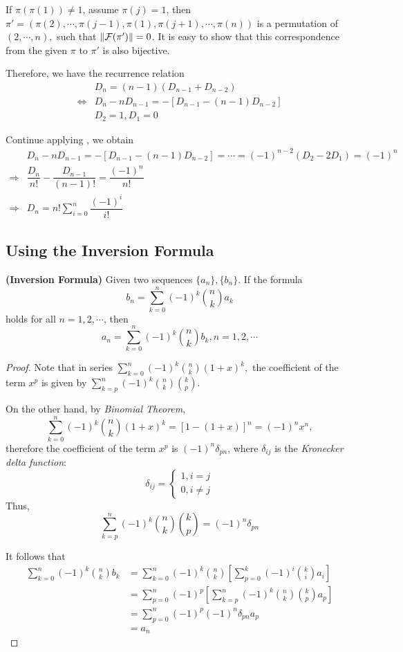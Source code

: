      If $ \pi(\pi(1)) \neq 1$, assume $ \pi(j) = 1$, then $ \pi' =(\pi(2), \cdots ,\pi(j-1), \pi(1), \pi(j+1), \cdots ,\pi(n))$
     is a permutation of $ (2,\cdots ,n),$ such that $\left\|\mathcal{F}(\pi')\right\|=0$.
     It is easy to show that this correspondence from the given $\pi$ to $ \pi'$ is also bijective.

     Therefore, we have the recurrence relation
\begin{align}
& D_n = (n-1)(D_{n-1}+D_{n-2}) \label{eqn:recurrence}\\
\Leftrightarrow & D_n - nD_{n-1} = - [D_{n-1}- (n-1)D_{n-2}] \label{eqn:recurrence-change}\\
&D_2 = 1, D_1 = 0 \nonumber
\end{align}

Continue applying , we obtain
\begin{align*}
 &D_n - nD_{n-1} = -[D_{n-1}-(n-1)D_{n-2}]= \cdots  =(-1)^{n-2}(D_2 - 2D_1) = (-1)^n \\
 \Rightarrow & \dfrac{D_n}{n!} - \dfrac{D_{n-1}}{(n-1)!} = \dfrac{(-1)^n}{n!} \\
 \Rightarrow &D_n = n! \sum_{i=0}^n{\dfrac{(-1)^i}{i!}}
\end{align*}

\subsection{Using the Inversion Formula}
\begin{lemma}
  \textbf{(Inversion Formula)}
  \label{lemma:inversion}
  Given two sequences $ \{ a_n\},\{ b_n\} $. If the formula
  \[  b_n = \sum_{k=0}^n(-1)^k{n\choose{k}}a_k\]
  holds for all $ n = 1,2,\cdots $, then
  \[ a_n = \sum_{k=0}^n(-1)^k{n\choose{k}}b_k, n = 1,2,\cdots \]
\end{lemma}
\begin{proof}
Note that in series $ \sum_{k=0}^n(-1)^k{n\choose{k}}(1+x)^k,$
the coefficient of the term $ x^p$ is given by $
\sum_{k=p}^n(-1)^k{n\choose{k}}{k\choose{p}}.$

On the other hand, by \emph{Binomial Theorem},
\[ \sum_{k=0}^n(-1)^k{n\choose{k}}(1+x)^k = [1-(1+x)]^n = (-1)^nx^n, \]
therefore the coefficient of the term $ x^p$ is $(-1)^n\delta_{pn} $, where $ \delta_{ij}$ is the
\emph{Kronecker delta function}:
\[ \delta_{ij} = \begin{cases}
  1, i = j \\ 0, i \ne j \end{cases} \]
  Thus,
  \[ \sum_{k=p}^n(-1)^k{n\choose{k}}{k\choose{p}} = (-1)^n\delta_{pn}\]

  It follows that
\begin{align*}
    \sum_{k=0}^n(-1)^k{n\choose{k}}b_k &=
    \sum_{k=0}^n(-1)^k{n\choose{k}}\left[\sum_{p=0}^k(-1)^i{k\choose{i}}a_i\right] \\
    &=\sum_{p=0}^n(-1)^p\left[\sum_{k=p}^n(-1)^k{n\choose{k}}{k\choose{p}}a_p\right] \\
   &=\sum_{p=0}^n(-1)^p(-1)^n\delta_{pn}a_p \\
   &= a_n
\end{align*} \end{proof}

